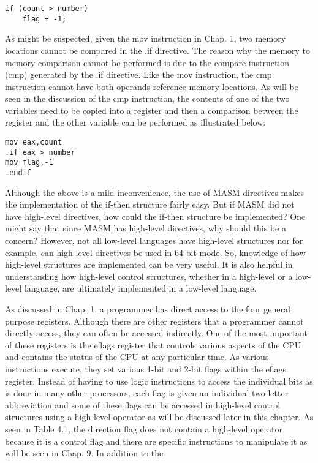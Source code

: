 \documentclass[10pt]{article}
\begin{document}
\begin{verbatim}
if (count > number)
    flag = -1;
\end{verbatim}

As might be suspected, given the mov instruction in Chap. 1, two memory locations cannot be compared in the .if directive. The reason why the memory to memory comparison cannot be performed is due to the compare instruction (cmp) generated by the .if directive. Like the mov instruction, the cmp instruction cannot have both operands reference memory locations. As will be seen in the discussion of the cmp instruction, the contents of one of the two variables need to be copied into a register and then a comparison between the register and the other variable can be performed as illustrated below:

\begin{verbatim}
mov eax,count
.if eax > number
mov flag,-1
.endif
\end{verbatim}

Although the above is a mild inconvenience, the use of MASM directives makes the implementation of the if-then structure fairly easy. But if MASM did not have high-level directives, how could the if-then structure be implemented? One might say that since MASM has high-level directives, why should this be a concern? However, not all low-level languages have high-level structures nor for example, can high-level directives be used in 64-bit mode. So, knowledge of how high-level structures are implemented can be very useful. It is also helpful in understanding how high-level control structures, whether in a high-level or a low-level language, are ultimately implemented in a low-level language.

As discussed in Chap. 1, a programmer has direct access to the four general purpose registers. Although there are other registers that a programmer cannot directly access, they can often be accessed indirectly. One of the most important of these registers is the eflags register that controls various aspects of the CPU and contains the status of the CPU at any particular time. As various instructions execute, they set various 1-bit and 2-bit flags within the eflags register. Instead of having to use logic instructions to access the individual bits as is done in many other processors, each flag is given an individual two-letter abbreviation and some of these flags can be accessed in high-level control structures using a high-level operator as will be discussed later in this chapter. As seen in Table 4.1, the direction flag does not contain a high-level operator because it is a control flag and there are specific instructions to manipulate it as will be seen in Chap. 9. In addition to the
\end{document}
